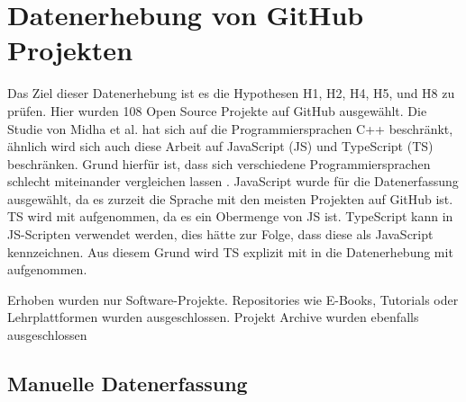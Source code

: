 \chapter{Datenerhebung von GitHub Projekten} \label{kap:Datenerhebung}

Das Ziel dieser Datenerhebung ist es die Hypothesen H1, H2, H4, H5, und H8 zu prüfen.
Hier wurden 108 Open Source Projekte auf GitHub ausgewählt.
Die Studie von Midha et al. hat sich auf die Programmiersprachen C++ beschränkt, ähnlich wird sich
auch diese Arbeit auf JavaScript (JS) und TypeScript (TS) beschränken. Grund hierfür ist, dass
sich verschiedene Programmiersprachen schlecht miteinander vergleichen lassen
\cite{midhaFactorsAffectingSuccess2012}.
JavaScript wurde für die Datenerfassung ausgewählt, da es zurzeit die Sprache mit den meisten
Projekten auf GitHub ist.
TS wird mit aufgenommen, da es ein Obermenge von JS ist. TypeScript kann in JS-Scripten verwendet
werden, dies hätte zur Folge, dass diese als JavaScript kennzeichnen. Aus diesem Grund wird TS explizit
mit in die Datenerhebung mit aufgenommen.

Erhoben wurden nur Software-Projekte. Repositories wie E-Books, Tutorials oder Lehrplattformen wurden
ausgeschlossen. Projekt Archive wurden ebenfalls ausgeschlossen




\section{Manuelle Datenerfassung}\label{sec:manuelle_datenerfassung}

